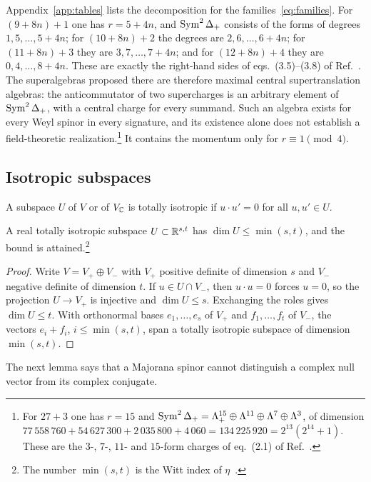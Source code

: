Appendix~\ref{app:tables} lists the decomposition for the families~\eqref{eq:families}. For $(9+8n)+1$ one has $r=5+4n$, and $\operatorname{Sym}^2\Delta_+$ consists of the forms of degrees $1,5,\dots,5+4n$; for $(10+8n)+2$ the degrees are $2,6,\dots,6+4n$; for $(11+8n)+3$ they are $3,7,\dots,7+4n$; and for $(12+8n)+4$ they are $0,4,\dots,8+4n$. These are exactly the right-hand sides of eqs.~(3.5)--(3.8) of Ref.~\cite{RiosMarraniChester2019}. The superalgebras proposed there are therefore maximal central supertranslation algebras: the anticommutator of two supercharges is an arbitrary element of $\operatorname{Sym}^2\Delta_+$, with a central charge for every summand. Such an algebra exists for every Weyl spinor in every signature, and its existence alone does not establish a field-theoretic realization.\footnote{For $27+3$ one has $r=15$ and $\operatorname{Sym}^2\Delta_+=\Lambda^{15}_+\oplus\Lambda^{11}\oplus\Lambda^7\oplus\Lambda^3$, of dimension $77\,558\,760+54\,627\,300+2\,035\,800+4\,060=134\,225\,920=2^{13}(2^{14}+1)$. These are the $3$-, $7$-, $11$- and $15$-form charges of eq.~(2.1) of Ref.~\cite{RiosMarraniChester2020}.} It contains the momentum only for $r\equiv1\pmod4$.

\subsection{Isotropic subspaces}

A subspace $U$ of $V$ or of $V_{\mathbb{C}}$ is totally isotropic if $u\cdot u'=0$ for all $u,u'\in U$.

\begin{lemma}
\label{lem:witt}
A real totally isotropic subspace $U\subset\mathbb{R}^{s,t}$ has $\dim U\le\min(s,t)$, and the bound is attained.\footnote{The number $\min(s,t)$ is the Witt index of $\eta$~\cite{Witt1937,Lam2005}.}
\end{lemma}

\begin{proof}
Write $V=V_+\oplus V_-$ with $V_+$ positive definite of dimension $s$ and $V_-$ negative definite of dimension $t$. If $u\in U\cap V_-$, then $u\cdot u=0$ forces $u=0$, so the projection $U\to V_+$ is injective and $\dim U\le s$. Exchanging the roles gives $\dim U\le t$. With orthonormal bases $e_1,\dots,e_s$ of $V_+$ and $f_1,\dots,f_t$ of $V_-$, the vectors $e_i+f_i$, $i\le\min(s,t)$, span a totally isotropic subspace of dimension $\min(s,t)$.
\end{proof}

The next lemma says that a Majorana spinor cannot distinguish a complex null vector from its complex conjugate.

